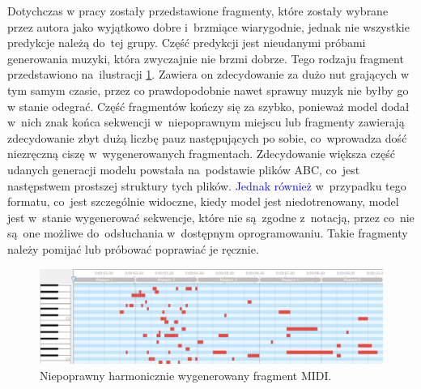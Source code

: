 \documentclass[data-science]{agh-wi} %
\begin{document}
Dotychczas w pracy zostały przedstawione fragmenty, które zostały wybrane przez autora jako wyjątkowo dobre i~brzmiące wiarygodnie, jednak nie wszystkie predykcje należą do~tej grupy. Część predykcji jest nieudanymi próbami generowania muzyki, która zwyczajnie nie brzmi dobrze. Tego rodzaju fragment przedstawiono na~ilustracji \ref*{fig:bad_midi}. Zawiera on zdecydowanie za dużo nut grających w tym samym czasie, przez co prawdopodobnie nawet sprawny muzyk nie byłby go w stanie odegrać. Część fragmentów kończy się za szybko, ponieważ model dodał w~nich znak końca sekwencji w~niepoprawnym miejscu lub fragmenty zawierają zdecydowanie zbyt dużą liczbę pauz następujących po sobie, co~wprowadza dość niezręczną ciszę w~wygenerowanych fragmentach. Zdecydowanie większa część udanych generacji modelu powstała na~podstawie plików ABC, co~jest następstwem prostszej struktury tych plików. \textcolor{blue}{Jednak również} w~przypadku tego formatu, co~jest szczególnie widoczne, kiedy model jest niedotrenowany, model jest w~stanie wygenerować sekwencje, które nie są~zgodne z~notacją, przez co~nie są~one możliwe do~odsłuchania w~dostępnym oprogramowaniu. Takie fragmenty należy pomijać lub próbować poprawiać je ręcznie.

\begin{figure}[ht!]
    \centering
    \includegraphics[width=0.9\linewidth]{./img/bad_midi.png}
    \caption{Niepoprawny harmonicznie wygenerowany fragment MIDI.}
    \label{fig:bad_midi}
\end{figure}
\end{document}

